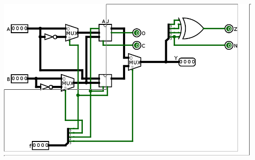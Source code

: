 \documentclass[11pt]{article}
\begin{document}
\begin{question}
{\begin{center}
		\includegraphics[scale=0.3]{IMAGES_15}
	\end{center}
}

\end{question}
\end{document}

